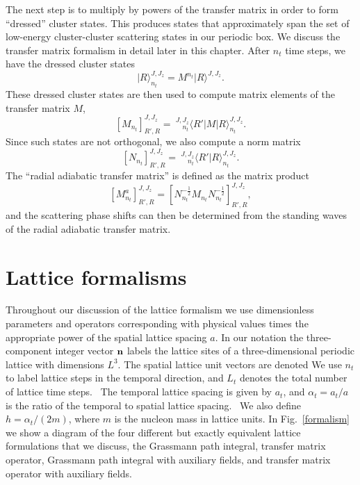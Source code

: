 The next step is to multiply by powers of the transfer matrix in order to
form ``dressed'' cluster
states. This produces states that approximately span the set of low-energy cluster-cluster scattering
states in our periodic box. We discuss the transfer matrix formalism in detail later in this chapter. After $n_t$ time steps, we have the dressed cluster
states 
%
\begin{equation}
\vert R\rangle^{J,J_z}_{n_t} = M^{n_t}|R\rangle^{J,J_z}.
\end{equation}
%
These dressed cluster states are then used to compute matrix
elements of the transfer matrix $M$,
%
\begin{equation}
\left[M_{n_t}\right]^{J,J_z}_{R',R} =\ ^{J,J_z}_{\!\!\!\!\!\quad{n_t}}\langle
R'\vert M \vert R\rangle^{J,J_z}_{n_t}.
\label{Hmatrix}
\end{equation}
%
Since such states are not orthogonal, we also compute a norm
matrix
% 
\begin{equation}
\left[N_{n_t}\right]^{J,J_z}_{R',R} =\ ^{J,J_z}_{\!\!\!\!\!\quad{n_t}}\langle
R'\vert R\rangle^{J,J_z}_{n_t}. 
\label{eqn:norm}
\end{equation}
%
The ``radial adiabatic transfer matrix'' is defined as the matrix product
%
\begin{equation}
\left[ {M^a_{n_t}} \right]^{J,J_z}_{R',R} = 
\left[N_{n_t}^{-\frac{1}{2}}M_{n_t}
N_{n_t}^{-\frac{1}{2}} \right]^{J,J_z}_{R',R},
\label{eqn:Adiabatic-Hamiltonian}
\end{equation}
%
and the scattering phase shifts can then be determined from the standing waves
of the radial adiabatic transfer matrix.  

\section{Lattice formalisms}

Throughout our discussion of the lattice formalism we use dimensionless
parameters and operators corresponding with physical values times
the
appropriate power of the spatial lattice spacing $a$. In our notation the
three-component integer vector ${\bf n}$ labels the lattice sites of a
three-dimensional periodic lattice with dimensions $L^{3}$. The spatial
lattice unit vectors are denoted 
We use $n_t$ to label lattice steps in the temporal direction, and $L_{t}$
denotes the total number of lattice time steps. \ The temporal lattice spacing
is given by $a_{t}$, and $\alpha_{t}=a_{t}/a$ is the ratio of the temporal
to
spatial lattice spacing. \ We also define $h=\alpha_{t}/(2m)$, where $m$
is
the nucleon mass in lattice units.  In Fig.~\ref{formalism} we show a diagram
of the four different but exactly equivalent lattice formulations that we
discuss, the Grassmann path integral, transfer matrix operator, Grassmann
path integral with auxiliary fields, and transfer matrix operator with auxiliary
fields.

